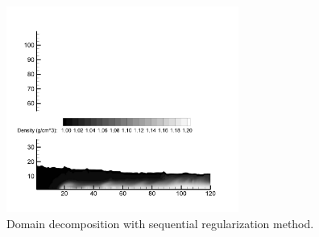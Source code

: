 \begin{figure}[h]
\begin{center}
\includegraphics[width=3.0in]{../figures/SRM/contour.pdf}
\end{center}
    \caption{Domain decomposition with sequential regularization method. }
    \label{fig:Wave-GravityCurrent-SRM-DDM}
\end{figure}

